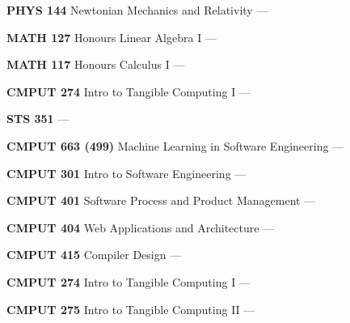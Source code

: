 \begin{cventries}
{\begin{cvitems}
      \item {\textbf{PHYS 144} Newtonian Mechanics and Relativity --- }
        \vspace{0.5mm}
      \item {\textbf{MATH 127} Honours Linear Algebra I --- }
        \vspace{0.5mm}
      \item {\textbf{MATH 117} Honours Calculus I --- }
        \vspace{0.5mm}
      \item {\textbf{CMPUT 274} Intro to Tangible Computing I --- }
        \vspace{1mm}
      \item {\textbf{STS 351} --- }
      \end{cvitems}
    }
    {
      \begin{cvitems} %
      \item {\textbf{CMPUT 663 (499)} Machine Learning in Software Engineering --- }
        \vspace{0.5mm}
      \item {\textbf{CMPUT 301} Intro to Software Engineering --- }
        \vspace{0.5mm}
      \item {\textbf{CMPUT 401} Software Process and Product Management --- }
        \vspace{0.5mm}
      \item {\textbf{CMPUT 404} Web Applications and Architecture --- }
        \vspace{0.5mm}
      \item {\textbf{CMPUT 415} Compiler Design --- }
        \vspace{0.5mm}
      \item {\textbf{CMPUT 274} Intro to Tangible Computing I --- }
        \vspace{0.5mm}
      \item {\textbf{CMPUT 275} Intro to Tangible Computing II --- }
        \vspace{1.5mm}


\end{cvitems}}
\end{cventries}
